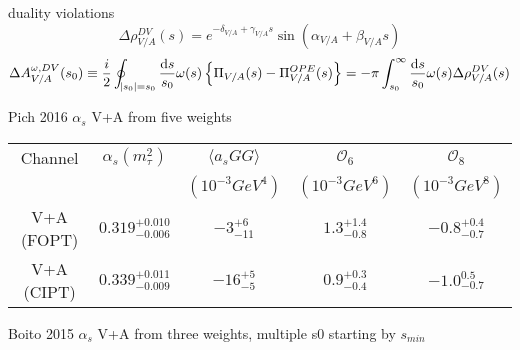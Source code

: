 \documentclass{article}
\begin{document}
  duality violations
  \begin{equation}
    \Delta \rho_{V/A}^{DV}(s) = e^{-\delta_{V/A}+\gamma_{V/A}s} \sin(\alpha_{V/A} + \beta_{V/A}s)
  \end{equation}
  \begin{equation}
    \Delta A_{V/A}^{\omega,DV}(s_0) \equiv \frac{i}{2} \oint_{\envert{s_0}=s_0} \frac{\dif s}{s_0} \omega(s) \left\{ \Pi_{V/A}(s) - \Pi_{V/A}^{OPE}(s) \right\} = -\pi \int_{s_0}^\infty \frac{\dif s}{s_0} \omega(s) \Delta \rho_{V/A}^{DV}(s)
  \end{equation}

  \begin{center}

    Pich 2016
    $\alpha_s$ V+A from five weights
    {\renewcommand{\arraystretch}{1.5}
      \begin{tabular}{| c | c | c | c | c |}
        \hline
        Channel & $\alpha_s(m_\tau^2)$ & $\langle a_sGG \rangle$
        & $\mathcal{O}_6$ & $\mathcal{O}_8$ \\ 
                & & $(10^{-3} GeV^4)$ & $(10^{-3} GeV^6)$ & $(10^{-3} GeV^8)$\\
        \hline
        V+A (FOPT) & $0.319^{+0.010}_{-0.006}$ & $-3^{+6}_{-11}$
        & $1.3^{+1.4}_{-0.8}$ & $-0.8^{+0.4}_{-0.7}$ \\  
        \hline
        V+A (CIPT) & $0.339^{+0.011}_{-0.009}$ & $-16^{+5}_{-5}$
        & $0.9^{+0.3}_{-0.4}$ & $-1.0^{0.5}_{-0.7}$\\    
        \hline
      \end{tabular}
    }
    

    Boito 2015
    $\alpha_s$ V+A from three weights, multiple s0 starting by $s_{min}$

  \end{center}
\end{document}
